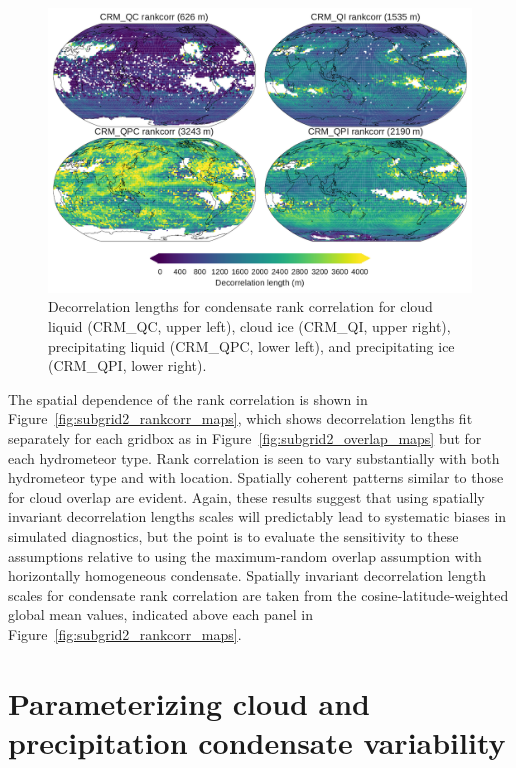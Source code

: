 \begin{figure}[htbp]
\centering
\includegraphics{graphics/subgrid2_rankcorr_maps.pdf}
\caption{\label{fig:subgrid2_rankcorr_maps}Decorrelation lengths for
condensate rank correlation for cloud liquid (CRM\_QC, upper left),
cloud ice (CRM\_QI, upper right), precipitating liquid (CRM\_QPC, lower
left), and precipitating ice (CRM\_QPI, lower
right).}\label{fig:subgrid2ux5frankcorrux5fmaps}
\end{figure}

The spatial dependence of the rank correlation is shown in
Figure~\ref{fig:subgrid2_rankcorr_maps}, which shows decorrelation
lengths fit separately for each gridbox as in
Figure~\ref{fig:subgrid2_overlap_maps} but for each hydrometeor type.
Rank correlation is seen to vary substantially with both hydrometeor
type and with location. Spatially coherent patterns similar to those for
cloud overlap are evident. Again, these results suggest that using
spatially invariant decorrelation lengths scales will predictably lead
to systematic biases in simulated diagnostics, but the point is to
evaluate the sensitivity to these assumptions relative to using the
maximum-random overlap assumption with horizontally homogeneous
condensate. Spatially invariant decorrelation length scales for
condensate rank correlation are taken from the cosine-latitude-weighted
global mean values, indicated above each panel in
Figure~\ref{fig:subgrid2_rankcorr_maps}.

\section{Parameterizing cloud and precipitation condensate
variability}\label{sec:subgrid2ux5fvariability}

